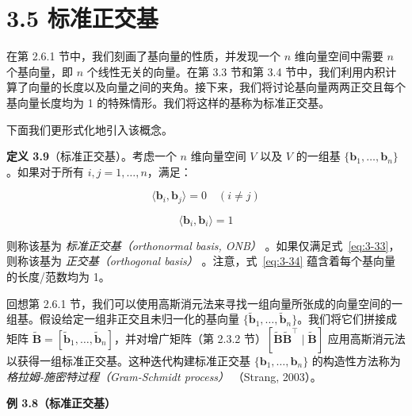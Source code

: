 \section*{3.5 标准正交基}
\label{sec:3.5}

在第 2.6.1 节中，我们刻画了基向量的性质，并发现一个 $ n $ 维向量空间中需要 $ n $ 个基向量，即 $ n $ 个线性无关的向量。在第 3.3 节和第 3.4 节中，我们利用内积计算了向量的长度以及向量之间的夹角。接下来，我们将讨论基向量两两正交且每个基向量长度均为 1 的特殊情形。我们将这样的基称为标准正交基。

下面我们更形式化地引入该概念。

\textbf{定义 3.9}（标准正交基）。考虑一个 $ n $ 维向量空间 $ V $ 以及 $ V $ 的一组基 $ \{\boldsymbol{b}_1, \ldots, \boldsymbol{b}_n\} $。如果对于所有 $ i, j = 1, \ldots, n $，满足：

\begin{equation}
\langle \boldsymbol{b}_i, \boldsymbol{b}_j \rangle = 0 \quad (i \neq j)
\tag{3.33}\label{eq:3-33}
\end{equation}

\begin{equation}
\langle \boldsymbol{b}_i, \boldsymbol{b}_i \rangle = 1
\tag{3.34}\label{eq:3-34}
\end{equation}

则称该基为 \emph{标准正交基（orthonormal basis, ONB）} 。如果仅满足式~\eqref{eq:3-33}，则称该基为 \emph{正交基（orthogonal basis）} 。注意，式~\eqref{eq:3-34} 蕴含着每个基向量的长度/范数均为 1。

回想第 2.6.1 节，我们可以使用高斯消元法来寻找一组向量所张成的向量空间的一组基。假设给定一组非正交且未归一化的基向量 $ \{\tilde{\boldsymbol{b}}_1, \ldots, \tilde{\boldsymbol{b}}_n\} $。我们将它们拼接成矩阵 $ \tilde{\boldsymbol{B}} = [\tilde{\boldsymbol{b}}_1, \ldots, \tilde{\boldsymbol{b}}_n] $，并对增广矩阵（第 2.3.2 节）$ [\tilde{\boldsymbol{B}}\tilde{\boldsymbol{B}}^\top \mid \tilde{\boldsymbol{B}}] $ 应用高斯消元法以获得一组标准正交基。这种迭代构建标准正交基 $ \{\boldsymbol{b}_1, \ldots, \boldsymbol{b}_n\} $ 的构造性方法称为 \emph{格拉姆-施密特过程（Gram-Schmidt process）} （Strang, 2003）。

\begin{notebox}
\textbf{例 3.8（标准正交基）}
\end{notebox}

